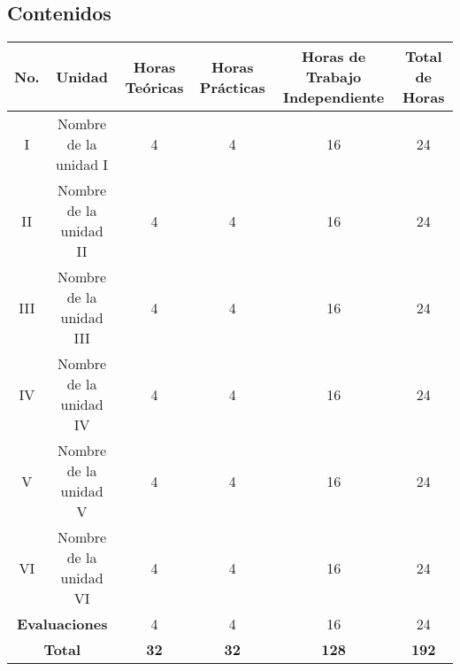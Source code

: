 \begin{landscape}
    \section{Contenidos}

    \begin{doublespace}
        \begin{tabular}{ | c | c | c | c | c | c | }
            \hline
            \textbf{No.}                                & \textbf{Unidad}         & \textbf{Horas Teóricas} & \textbf{Horas Prácticas} & \textbf{Horas de Trabajo Independiente} & \textbf{Total de Horas} \\
            \hline
            I                                           & Nombre de la unidad I   & 4                       & 4                        & 16                                      & 24                      \\
            \hline
            II                                          & Nombre de la unidad II  & 4                       & 4                        & 16                                      & 24                      \\
            \hline
            III                                         & Nombre de la unidad III & 4                       & 4                        & 16                                      & 24                      \\
            \hline
            IV                                          & Nombre de la unidad IV  & 4                       & 4                        & 16                                      & 24                      \\
            \hline
            V                                           & Nombre de la unidad V   & 4                       & 4                        & 16                                      & 24                      \\
            \hline
            VI                                          & Nombre de la unidad VI  & 4                       & 4                        & 16                                      & 24                      \\
            \hline
            \multicolumn{2}{|c|}{\textbf{Evaluaciones}} & 4                       & 4                       & 16                       & 24                                                                \\
            \hline
            \multicolumn{2}{|c|}{\textbf{Total}}        & \textbf{32}             & \textbf{32}             & \textbf{128}             & \textbf{192}                                                      \\
            \hline
        \end{tabular}
    \end{doublespace}
\end{landscape}
\pagebreak